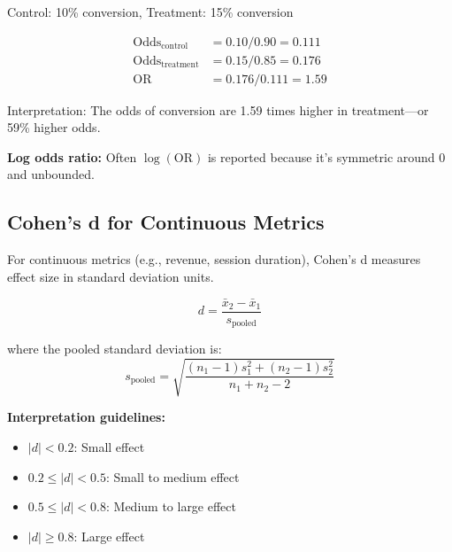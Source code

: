 \begin{example}
Control: 10\% conversion, Treatment: 15\% conversion

\begin{align}
\text{Odds}_{\text{control}} &= 0.10/0.90 = 0.111 \\
\text{Odds}_{\text{treatment}} &= 0.15/0.85 = 0.176 \\
\text{OR} &= 0.176/0.111 = 1.59
\end{align}

Interpretation: The odds of conversion are 1.59 times higher in treatment—or 59\% higher odds.
\end{example}

\textbf{Log odds ratio:} Often $\log(\text{OR})$ is reported because it's symmetric around 0 and unbounded.

\subsection{Cohen's d for Continuous Metrics}

For continuous metrics (e.g., revenue, session duration), Cohen's d measures effect size in standard deviation units.

\begin{definition}[Cohen's d]
\begin{equation}
d = \frac{\bar{x}_2 - \bar{x}_1}{s_{\text{pooled}}}
\end{equation}

where the pooled standard deviation is:
\begin{equation}
s_{\text{pooled}} = \sqrt{\frac{(n_1-1)s_1^2 + (n_2-1)s_2^2}{n_1 + n_2 - 2}}
\end{equation}
\end{definition}

\textbf{Interpretation guidelines:}
\begin{itemize}
    \item $|d| < 0.2$: Small effect
    \item $0.2 \leq |d| < 0.5$: Small to medium effect
    \item $0.5 \leq |d| < 0.8$: Medium to large effect
    \item $|d| \geq 0.8$: Large effect
\end{itemize}

